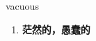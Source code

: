 
\begin{frame}
{\huge vacuous}
\begin{center}
\begin{enumerate}\Large
  \item \textbf{茫然的，愚蠢的}
\end{enumerate}
\end{center}
\end{frame}
